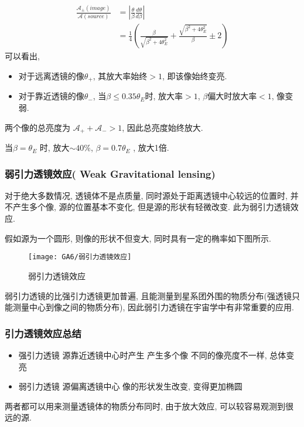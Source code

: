 \begin{align*}
    \frac{\mathcal{A}_\pm (image)}{\mathcal{A}(source)}&=\left| \frac{\theta}{\beta}\frac{d\theta}{d\beta} \right|\\
    &=\frac{1}{4}\left( \frac{\beta}{\sqrt{\beta^2+4\theta_E^2}}+\frac{\sqrt{\beta^2+4\theta_E^2}}{\beta}\pm 2 \right)
\end{align*}
可以看出, 
\begin{itemize}\small
    \item 对于远离透镜的像$\theta_+$, 其放大率始终$>1$, 即该像始终变亮. 
    \item 对于靠近透镜的像$\theta_{-}$, 当$\beta\le 0.35\theta_E$时, 放大率$>1$, $\beta$偏大时放大率$<1$, 像变弱. 
\end{itemize}
两个像的总亮度为 $\mathcal{A}_++\mathcal{A}_->1$, 因此总亮度始终放大. 

当$\beta=\theta_E$ 时, 放大$\sim 40\%$, $\beta=0.7\theta_E$ , 放大1倍. 

\subsubsection{弱引力透镜效应( Weak Gravitational lensing)}
对于绝大多数情况, 透镜体不是点质量, 同时源处于距离透镜中心较远的位置时, 并不产生多个像, 源的位置基本不变化, 但是源的形状有轻微改变. 此为弱引力透镜效应. 

假如源为一个圆形, 则像的形状不但变大, 同时具有一定的椭率如下图所示. 
\begin{figure}[!htb]
    \centering
    \texttt{[image: GA6/弱引力透镜效应]}
    \caption{弱引力透镜效应}
\end{figure}

弱引力透镜的比强引力透镜更加普遍, 且能测量到星系团外围的物质分布(强透镜只能测量中心到像之间的物质分布), 因此弱引力透镜在宇宙学中有非常重要的应用. 

\subsubsection{引力透镜效应总结}
\begin{itemize}\small
    \item 强引力透镜
    \subitem 源靠近透镜中心时产生
    \subitem 产生多个像
    \subitem 不同的像亮度不一样, 总体变亮
    \item 弱引力透镜
    \subitem 源偏离透镜中心
    \subitem 像的形状发生改变, 变得更加椭圆
\end{itemize}
两者都可以用来测量透镜体的物质分布同时, 由于放大效应, 可以较容易观测到很远的源. 

